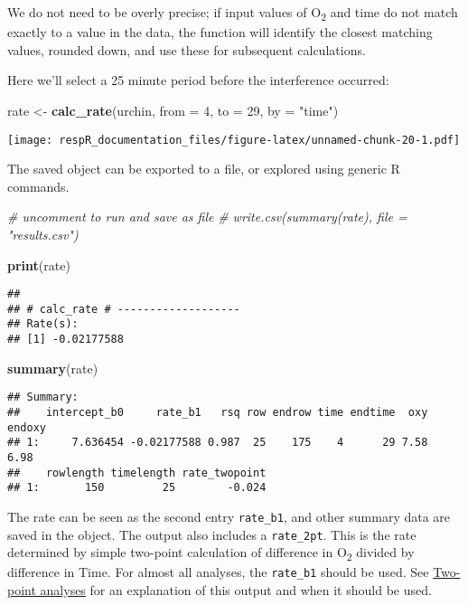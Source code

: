\documentclass[]{book}
\newenvironment{Shaded}{\begin{snugshade}}{\end{snugshade}}
\newcommand{\KeywordTok}[1]{\textcolor[rgb]{0.13,0.29,0.53}{\textbf{#1}}}
\newcommand{\DataTypeTok}[1]{\textcolor[rgb]{0.13,0.29,0.53}{#1}}
\newcommand{\DecValTok}[1]{\textcolor[rgb]{0.00,0.00,0.81}{#1}}
\newcommand{\StringTok}[1]{\textcolor[rgb]{0.31,0.60,0.02}{#1}}
\newcommand{\CommentTok}[1]{\textcolor[rgb]{0.56,0.35,0.01}{\textit{#1}}}
\newcommand{\NormalTok}[1]{#1}
\begin{document}
We do not need to be overly precise; if input values of
O\textsubscript{2} and time do not match exactly to a value in the data,
the function will identify the closest matching values, rounded down,
and use these for subsequent calculations.

Here we'll select a 25 minute period before the interference occurred:

\begin{Shaded}
\begin{Highlighting}[]
\NormalTok{rate <-}\StringTok{ }\KeywordTok{calc_rate}\NormalTok{(urchin, }\DataTypeTok{from =} \DecValTok{4}\NormalTok{, }\DataTypeTok{to =} \DecValTok{29}\NormalTok{, }\DataTypeTok{by =} \StringTok{"time"}\NormalTok{)}
\end{Highlighting}
\end{Shaded}

\texttt{[image: respR\_documentation\_files/figure-latex/unnamed-chunk-20-1.pdf]}

The saved object can be exported to a file, or explored using generic R
commands.

\begin{Shaded}
\begin{Highlighting}[]
\CommentTok{# uncomment to run and save as file}
\CommentTok{# write.csv(summary(rate), file = "results.csv")}

\KeywordTok{print}\NormalTok{(rate)}
\end{Highlighting}
\end{Shaded}

\begin{verbatim}
## 
## # calc_rate # -------------------
## Rate(s):
## [1] -0.02177588
\end{verbatim}

\begin{Shaded}
\begin{Highlighting}[]
\KeywordTok{summary}\NormalTok{(rate)}
\end{Highlighting}
\end{Shaded}

\begin{verbatim}
## Summary:
##    intercept_b0     rate_b1   rsq row endrow time endtime  oxy endoxy
## 1:     7.636454 -0.02177588 0.987  25    175    4      29 7.58   6.98
##    rowlength timelength rate_twopoint
## 1:       150         25        -0.024
\end{verbatim}

The rate can be seen as the second entry \texttt{rate\_b1}, and other
summary data are saved in the object. The output also includes a
\texttt{rate\_2pt}. This is the rate determined by simple two-point
calculation of difference in O\textsubscript{2} divided by difference in
Time. For almost all analyses, the \texttt{rate\_b1} should be used. See
\href{https://januarharianto.github.io/respR/articles/twopoint.html}{Two-point
analyses} for an explanation of this output and when it should be used.
\end{document}

